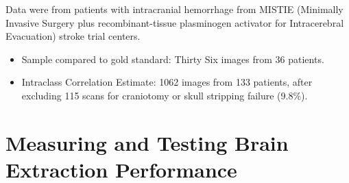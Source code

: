 \documentclass[final]{beamer}\usepackage[]{graphicx}\usepackage[]{color}
\makeatletter
\newenvironment{kframe}{%
 \def\at@end@of@kframe{}%
 \ifinner\ifhmode%
  \def\at@end@of@kframe{\end{minipage}}%
  \begin{minipage}{\columnwidth}%
 \fi\fi%
 \def\FrameCommand##1{\hskip\@totalleftmargin \hskip-\fboxsep
 \colorbox{shadecolor}{##1}\hskip-\fboxsep
     \hskip-\linewidth \hskip-\@totalleftmargin \hskip\columnwidth}%
 \MakeFramed {\advance\hsize-\width
   \@totalleftmargin\z@ \linewidth\hsize
   \@setminipage}}%
 {\par\unskip\endMakeFramed%
 \at@end@of@kframe}
\newenvironment{knitrout}{}{} %
\makeatother
\begin{document}
\begin{frame}[fragile]
\begin{minipage}{0.39\linewidth}
\begin{multicols}{2}
Data were from patients with intracranial hemorrhage from MISTIE (Minimally Invasive Surgery plus recombinant-tissue plasminogen activator for Intracerebral Evacuation) stroke trial centers.
\begin{itemize}
\item Sample compared to gold standard: Thirty Six images from 36 patients. 
\item Intraclass Correlation Estimate: 1062 images from 133 patients, after excluding 115 scans for craniotomy or skull stripping failure (9.8\%).  
\end{itemize}
\end{multicols}
%



\section{Measuring and Testing Brain Extraction Performance}

\begin{knitrout}
\color{fgcolor}\begin{kframe}



\end{kframe}
\end{knitrout}
\end{minipage}
\end{frame}
\end{document}

